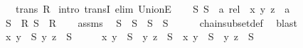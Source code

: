 \begin{isabellebody}
\ \ \ {\isachardoublequoteopen}trans\ {\isacharparenleft}{\kern0pt}{\isasymUnion}R{\isacharparenright}{\kern0pt}{\isachardoublequoteclose}\isanewline
%
\isadelimproof
%
\endisadelimproof
%
\isatagproof
{}\isamarkupfalse%
\ {\isacharparenleft}{\kern0pt}intro\ transI{\isacharcomma}{\kern0pt}\ elim\ UnionE{\isacharparenright}{\kern0pt}\isanewline
\ \ \isamarkupfalse%
\ S{}\ S{}\ {\isacharcolon}{\kern0pt}{\isacharcolon}{\kern0pt}\ {\isachardoublequoteopen}{\isacharprime}{\kern0pt}a\ rel{\isachardoublequoteclose}\ \ x\ y\ z\ {\isacharcolon}{\kern0pt}{\isacharcolon}{\kern0pt}\ {\isacharprime}{\kern0pt}a\isanewline
\ \ \isamarkupfalse%
\ {\isachardoublequoteopen}S{}\ {\isasymin}\ R{\isachardoublequoteclose}\ {\isachardoublequoteopen}S{}\ {\isasymin}\ R{\isachardoublequoteclose}\isanewline
\ \ \isamarkupfalse%
\ assms{\isacharparenleft}{\kern0pt}{}{\isacharparenright}{\kern0pt}\ \isamarkupfalse%
\ {\isachardoublequoteopen}S{}\ {\isasymsubseteq}\ S{}\ {\isasymor}\ S{}\ {\isasymsubseteq}\ S{}{\isachardoublequoteclose}\isanewline
\ \ \ \ \isamarkupfalse%
\ chain{\isacharunderscore}{\kern0pt}subset{\isacharunderscore}{\kern0pt}def\ \isamarkupfalse%
\ blast\isanewline
\ \ \isamarkupfalse%
\ \isamarkupfalse%
\ {\isachardoublequoteopen}{\isacharparenleft}{\kern0pt}x{\isacharcomma}{\kern0pt}\ y{\isacharparenright}{\kern0pt}\ {\isasymin}\ S{}{\isachardoublequoteclose}\ {\isachardoublequoteopen}{\isacharparenleft}{\kern0pt}y{\isacharcomma}{\kern0pt}\ z{\isacharparenright}{\kern0pt}\ {\isasymin}\ S{}{\isachardoublequoteclose}\isanewline
\ \ \isamarkupfalse%
\ \isamarkupfalse%
\ {\isachardoublequoteopen}{\isacharparenleft}{\kern0pt}{\isacharparenleft}{\kern0pt}x{\isacharcomma}{\kern0pt}\ y{\isacharparenright}{\kern0pt}\ {\isasymin}\ S{}\ {\isasymand}\ {\isacharparenleft}{\kern0pt}y{\isacharcomma}{\kern0pt}\ z{\isacharparenright}{\kern0pt}\ {\isasymin}\ S{}{\isacharparenright}{\kern0pt}\ {\isasymor}\ {\isacharparenleft}{\kern0pt}{\isacharparenleft}{\kern0pt}x{\isacharcomma}{\kern0pt}\ y{\isacharparenright}{\kern0pt}\ {\isasymin}\ S{}\ {\isasymand}\ {\isacharparenleft}{\kern0pt}y{\isacharcomma}{\kern0pt}\ z{\isacharparenright}{\kern0pt}\ {\isasymin}\ S{}{\isacharparenright}{\kern0pt}{\isachardoublequoteclose}\isanewline

\end{isabellebody}
